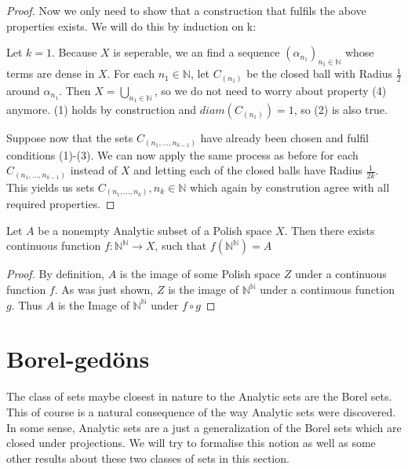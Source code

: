 \documentclass[10pt, a4paper, titlepage]{article}
\numberwithin{equation}{section}
\begin{document}
\begin{proof}
Now we only need to show that a construction that fulfils the above properties exists.
We will do this by induction on k:

Let $k=1$. Because  $X$ is seperable, we an find a sequence  $\left( \alpha_{n_1} \right)_{n_1 \in \mathbb{N}} $ whose terms are dense in $X$. 
For each  $n_1 \in  \mathbb{N}$, let $C_{\left( n_1 \right) }$ be the closed ball with Radius $\frac{1}{2}$ around $\alpha_{n_1}$.
Then $X = \bigcup_{n_1 \in  \mathbb{N}}$, so we do not need to worry about property (4) anymore. 
(1) holds by construction and $diam \left( C_{\left( n_1 \right) } \right) = 1$, so (2) is also true. 

Suppose now that the sets $C_{\left( n_1,\ldots,n_{k-1} \right) }$ have already been chosen and fulfil conditions (1)-(3).
We can now apply the same process as before for each $C_{\left( n_1,\ldots,n_{k-1} \right) }$ instead of $X$ and letting each of the closed balls have Radius  $\frac{1}{2k}$. This yields us sets $C_{\left( n_1,\ldots,n_k \right) }, n_k \in \mathbb{N}$ which again by constrution agree with all required properties. 
\end{proof}









\begin{theorem}
	Let $A$ be a nonempty Analytic subset of a Polish space $X$. Then there exists continuous function $f: \mathbb{N}^{\mathbb{N}} \to X$, such that $f\left( \mathbb{N}^{\mathbb{N}} \right) = A$
\end{theorem}
\begin{proof}
	By definition, $A$ is the image of some Polish space $Z$ under a continuous function $f$. As was just shown,  $Z$ is the image of  $\mathbb{N}^\mathbb{N}$ under a continuous function $g$.
	Thus  $A$ is the Image of  $\mathbb{N}^\mathbb{N}$ under $f \circ g$
\end{proof}


\section{Borel-gedöns}
The class of sets maybe closest in nature to the Analytic sets are the Borel sets. 
This of course is a natural consequence of the way Analytic sets were discovered. 
In some sense, Analytic sets are a just a generalization of the Borel sets which are closed under projections. 
We will try to formalise this notion as well as some other results about these two classes of sets in this section.
\end{document}
